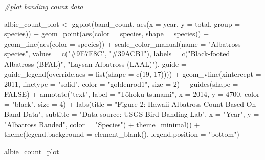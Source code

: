 \documentclass[
]{article}
\newenvironment{Shaded}{\begin{snugshade}}{\end{snugshade}}
\newcommand{\AttributeTok}[1]{\textcolor[rgb]{0.77,0.63,0.00}{#1}}
\newcommand{\CommentTok}[1]{\textcolor[rgb]{0.56,0.35,0.01}{\textit{#1}}}
\newcommand{\ConstantTok}[1]{\textcolor[rgb]{0.00,0.00,0.00}{#1}}
\newcommand{\DecValTok}[1]{\textcolor[rgb]{0.00,0.00,0.81}{#1}}
\newcommand{\FunctionTok}[1]{\textcolor[rgb]{0.00,0.00,0.00}{#1}}
\newcommand{\NormalTok}[1]{#1}
\newcommand{\OtherTok}[1]{\textcolor[rgb]{0.56,0.35,0.01}{#1}}
\newcommand{\SpecialCharTok}[1]{\textcolor[rgb]{0.00,0.00,0.00}{#1}}
\newcommand{\StringTok}[1]{\textcolor[rgb]{0.31,0.60,0.02}{#1}}
\begin{document}
\begin{Shaded}
\begin{Highlighting}[]
\CommentTok{\#plot banding count data}

\NormalTok{albie\_count\_plot }\OtherTok{\textless{}{-}} \FunctionTok{ggplot}\NormalTok{(band\_count, }\FunctionTok{aes}\NormalTok{(}\AttributeTok{x =}\NormalTok{ year, }\AttributeTok{y =}\NormalTok{ total, }\AttributeTok{group =}\NormalTok{ species)) }\SpecialCharTok{+}
  \FunctionTok{geom\_point}\NormalTok{(}\FunctionTok{aes}\NormalTok{(}\AttributeTok{color =}\NormalTok{ species,}
                 \AttributeTok{shape =}\NormalTok{ species)) }\SpecialCharTok{+}
  \FunctionTok{geom\_line}\NormalTok{(}\FunctionTok{aes}\NormalTok{(}\AttributeTok{color =}\NormalTok{ species)) }\SpecialCharTok{+}
  \FunctionTok{scale\_color\_manual}\NormalTok{(}\AttributeTok{name =} \StringTok{"Albatross species"}\NormalTok{,}
                     \AttributeTok{values =} \FunctionTok{c}\NormalTok{(}\StringTok{"\#9E7E8C"}\NormalTok{, }\StringTok{"\#39ACB1"}\NormalTok{),}
                     \AttributeTok{labels =} \FunctionTok{c}\NormalTok{(}\StringTok{"Black{-}footed Albatross (BFAL)"}\NormalTok{, }\StringTok{"Laysan Albatross (LAAL)"}\NormalTok{),}
                     \AttributeTok{guide =} \FunctionTok{guide\_legend}\NormalTok{(}\AttributeTok{override.aes =} \FunctionTok{list}\NormalTok{(}\AttributeTok{shape =} \FunctionTok{c}\NormalTok{(}\DecValTok{19}\NormalTok{, }\DecValTok{17}\NormalTok{)))) }\SpecialCharTok{+}
  \FunctionTok{geom\_vline}\NormalTok{(}\AttributeTok{xintercept =} \DecValTok{2011}\NormalTok{,}
             \AttributeTok{linetype =} \StringTok{"solid"}\NormalTok{,}
             \AttributeTok{color =} \StringTok{"goldenrod1"}\NormalTok{,}
             \AttributeTok{size =} \DecValTok{2}\NormalTok{) }\SpecialCharTok{+}
  \FunctionTok{guides}\NormalTok{(}\AttributeTok{shape =} \ConstantTok{FALSE}\NormalTok{) }\SpecialCharTok{+}
  \FunctionTok{annotate}\NormalTok{(}\StringTok{"text"}\NormalTok{,}
           \AttributeTok{label =} \StringTok{"Tōhoku tsunami"}\NormalTok{,}
           \AttributeTok{x =} \DecValTok{2014}\NormalTok{,}
           \AttributeTok{y =} \DecValTok{4700}\NormalTok{,}
           \AttributeTok{color =} \StringTok{"black"}\NormalTok{,}
           \AttributeTok{size =} \DecValTok{4}\NormalTok{) }\SpecialCharTok{+}
  \FunctionTok{labs}\NormalTok{(}\AttributeTok{title =} \StringTok{"Figure 2: Hawaii Albatross Count Based On Band Data"}\NormalTok{,}
       \AttributeTok{subtitle =} \StringTok{"Data source: USGS Bird Banding Lab"}\NormalTok{,}
       \AttributeTok{x =} \StringTok{"Year"}\NormalTok{,}
       \AttributeTok{y =} \StringTok{"Albatross Banded"}\NormalTok{,}
       \AttributeTok{color =} \StringTok{"Species"}\NormalTok{) }\SpecialCharTok{+}
  \FunctionTok{theme\_minimal}\NormalTok{() }\SpecialCharTok{+}
  \FunctionTok{theme}\NormalTok{(}\AttributeTok{legend.background =} \FunctionTok{element\_blank}\NormalTok{(),}
        \AttributeTok{legend.position =} \StringTok{"bottom"}\NormalTok{)  }
  
\NormalTok{albie\_count\_plot}
\end{Highlighting}
\end{Shaded}
\end{document}
